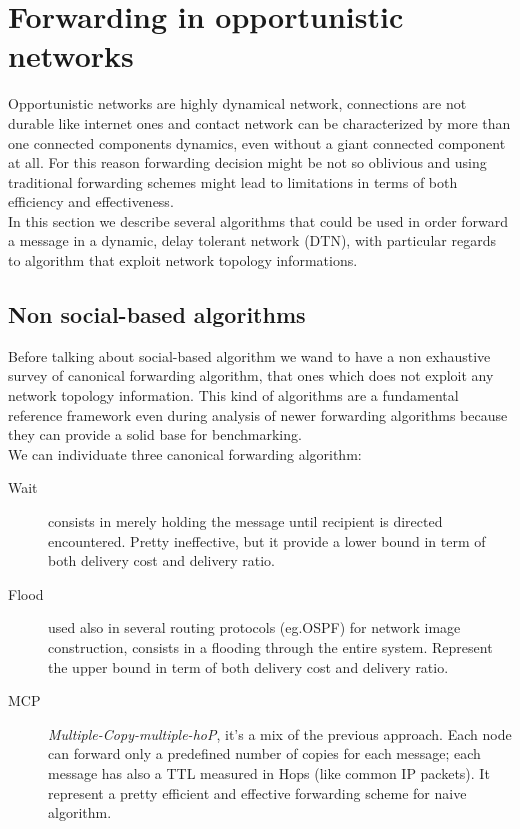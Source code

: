 \section{Forwarding in opportunistic networks}
\label{forwarding}

Opportunistic networks are highly dynamical network, connections are not durable like internet ones and contact network can be characterized by more than one connected components dynamics, even without a giant connected component at all. For this reason forwarding decision might be not so oblivious and using traditional forwarding schemes might lead to limitations in terms of both efficiency and effectiveness. \\
In this section we describe several algorithms that could be used in order forward a message in a dynamic, delay tolerant network (DTN), with particular regards to algorithm that exploit network topology informations.

\subsection{Non social-based algorithms}
\label{f_non_social}
Before talking about social-based algorithm we wand to have a non exhaustive survey of canonical forwarding algorithm, that ones which does not exploit any network topology information. This kind of algorithms are a fundamental reference framework even during analysis of newer forwarding algorithms because they can provide a solid base for benchmarking. \\
We can individuate three canonical forwarding algorithm:

\begin{description}
\item[Wait] consists in merely holding the message until recipient is directed encountered. Pretty ineffective, but it provide a lower bound in term of both delivery cost and delivery ratio.
\item[Flood] used also in several routing protocols (eg.OSPF) for network image construction, consists in a flooding through the entire system. Represent the upper bound in term of both delivery cost and delivery ratio.
\item[MCP] \emph{Multiple-Copy-multiple-hoP}, it's a mix of the previous approach. Each node can forward only a predefined number of copies for each message; each message has also a TTL measured in Hops (like common IP packets). It represent a pretty efficient and effective forwarding scheme for naive algorithm.\end{description} 

